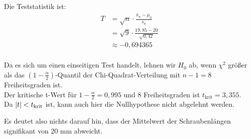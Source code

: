 \documentclass[main.tex]{subfiles}
\begin{document}
Die Teststatistik ist:
$$\begin{aligned}
    T &= \sqrt{n} \cdot \frac{\overline{x}_n - \mu_0}{s_n} \\
    &= \sqrt{9} \cdot \frac{19,85 - 20}{\sqrt{0,42}} \\
    &\approx - 0,694365 \\
\end{aligned}
$$

Da es sich um einen einseitigen Test handelt, lehnen wir $H_0$ ab, wenn $\chi^2$ größer als das $(1-\frac{\alpha}{2})$-Quantil der Chi-Quadrat-Verteilung mit $n-1=8$ Freiheitsgraden ist.\\

Der kritische t-Wert für $1-\frac{\alpha}{2} = 0,995$ und 8 Freiheitsgraden ist $t_{\text{krit}} = 3,355$.\\

Da $\lvert t\rvert < t_{\text{krit}}$ ist, kann auch hier die Nullhypothese nicht abgelehnt werden.

Es deutet also nichts darauf hin, dass der Mittelwert der Schraubenlängen signifikant von 20 mm abweicht.
\end{document}
